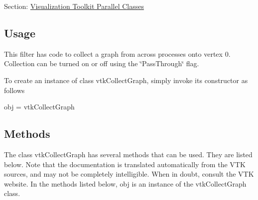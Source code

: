 Section\-: \hyperlink{sec_vtkparallel}{Visualization Toolkit Parallel Classes} \hypertarget{vtkwidgets_vtkxyplotwidget_Usage}{}\subsection{Usage}\label{vtkwidgets_vtkxyplotwidget_Usage}
This filter has code to collect a graph from across processes onto vertex 0. Collection can be turned on or off using the \char`\"{}\-Pass\-Through\char`\"{} flag.

To create an instance of class vtk\-Collect\-Graph, simply invoke its constructor as follows \begin{DoxyVerb}  obj = vtkCollectGraph
\end{DoxyVerb}
 \hypertarget{vtkwidgets_vtkxyplotwidget_Methods}{}\subsection{Methods}\label{vtkwidgets_vtkxyplotwidget_Methods}
The class vtk\-Collect\-Graph has several methods that can be used. They are listed below. Note that the documentation is translated automatically from the V\-T\-K sources, and may not be completely intelligible. When in doubt, consult the V\-T\-K website. In the methods listed below, {\ttfamily obj} is an instance of the vtk\-Collect\-Graph class. 
